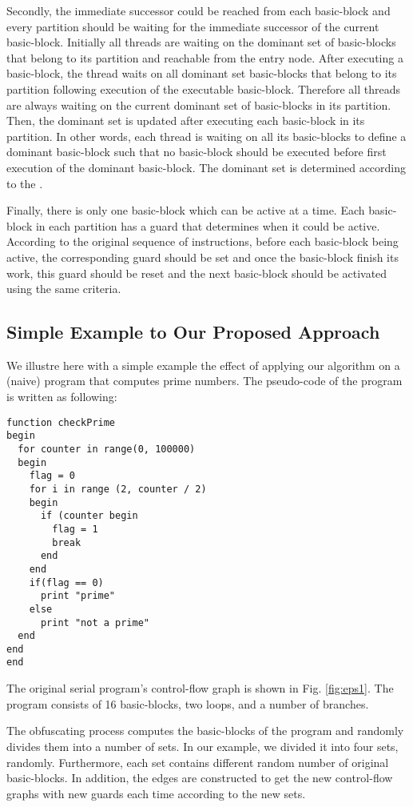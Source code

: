 \documentclass[3p,times,procedia,twocolumn,letterpaper]{elsarticle}
\begin{document}
Secondly, the immediate successor could be reached from each basic-block and every partition should be waiting for the immediate successor of the current basic-block. Initially all threads are waiting on the dominant set of basic-blocks that belong to its partition and reachable from the  entry node. After executing a basic-block, the thread waits on all dominant set basic-blocks that belong to its partition following execution of the executable basic-block. Therefore all threads are always waiting on the current dominant set of basic-blocks in its partition. Then, the dominant set is updated after executing each basic-block in its partition. In other words, each thread is waiting on all its basic-blocks to define a dominant basic-block such that no basic-block should be executed before first execution of the dominant basic-block. The dominant set is determined according to the .

Finally, there is only one basic-block which can be active at a time. Each basic-block in each partition has a guard that determines when it could be active. According to the original sequence of instructions, before each basic-block being active, the corresponding guard should be set and once the basic-block finish its work, this guard should be reset and the next basic-block should be activated using the same criteria.

\subsection{Simple Example to Our Proposed Approach}
\label{example}
We illustre here with a simple example the effect of applying our algorithm on a (naive) program that computes prime numbers. The pseudo-code of the program is written as following:
\noindent
\small
\begin{verbatim}
function checkPrime
begin
  for counter in range(0, 100000)
  begin
    flag = 0
    for i in range (2, counter / 2)
    begin
      if (counter begin
      	flag = 1
      	break
      end
    end
    if(flag == 0)
      print "prime"
    else
      print "not a prime"
  end
end
end
 \end{verbatim}
\noindent
\normalsize

The original serial program's control-flow graph is shown in Fig. \ref{fig:eps1}. The program consists of 16 basic-blocks, two loops, and a number of branches.

The obfuscating process computes the basic-blocks of the program and randomly divides them into a number of sets. In our example, we divided it into four sets, randomly. Furthermore, each set contains different random number of original basic-blocks. In addition, the edges are constructed to get the new control-flow graphs with new guards each time according to the new sets. 
\end{document}
